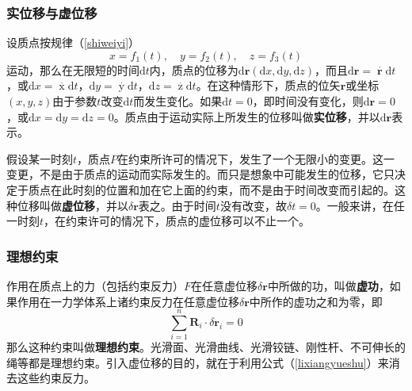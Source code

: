 \documentclass[withoutpreface,bwprint]{cumcmthesis} %
\begin{document}
\subsubsection{实位移与虚位移}
\par 设质点按规律（\ref{shiweiyi}）
\begin{equation}
	\label{shiweiyi}
	x = f_1(t),\quad y = f_2(t),\quad z = f_3(t)
\end{equation}
运动，那么在无限短的时间$\mathrm{d}t$内，质点的位移为$\mathrm{d} \textbf{r}(\mathrm{d}x,\mathrm{d}y,\mathrm{d}z)$，而且$\mathrm{d} \textbf{r} = \mathop{\textbf{r}}\limits^{\cdot} \mathrm{d}t$，或$\mathrm{d}x = \mathop{x}\limits^{\cdot} \mathrm{d}t$，$\mathrm{d}y = \mathop{y}\limits^{\cdot} \mathrm{d}t$，$\mathrm{d}z = \mathop{z}\limits^{\cdot} \mathrm{d}t$。在这种情形下，质点的位矢$\textbf{r}$或坐标$(x,y,z)$由于参数$t$改变$\mathrm{d}t$而发生变化。如果$\mathrm{d}t = 0$，即时间没有变化，则$\mathrm{d} \textbf{r} = 0$，或$\mathrm{d}x= \mathrm{d}y= \mathrm{d}z=0$。质点由于运动实际上所发生的位移叫做\textbf{实位移}，并以$\mathrm{d} \textbf{r}$表示。
\par 假设某一时刻$t$，质点$P$在约束所许可的情况下，发生了一个无限小的变更。这一变更，不是由于质点的运动而实际发生的。而只是想象中可能发生的位移，它只决定于质点在此时刻的位置和加在它上面的约束，而不是由于时间改变而引起的。这种位移叫做\textbf{虚位移}，并以$\delta \textbf{r}$表之。由于时间$t$没有改变，故$\delta t =0$。一般来讲，在任一时刻$t$，在约束许可的情况下，质点的虚位移可以不止一个。
\subsubsection{理想约束}
\par 作用在质点上的力（包括约束反力）$F$在任意虚位移$\delta \textbf{r}$中所做的功，叫做\textbf{虚功}，如果作用在一力学体系上诸约束反力在任意虚位移$\delta \textbf{r}$中所作的虚功之和为零，即
\begin{equation}
	\label{lixiangyueshu}
	\sum\limits_{i=1}^{n} \textbf{R}_i \cdot \delta \textbf{r}_i = 0
\end{equation}
那么这种约束叫做\textbf{理想约束}。光滑面、光滑曲线、光滑铰链、刚性杆、不可伸长的绳等都是理想约束。引入虚位移的目的，就在于利用公式（\ref{lixiangyueshu}）来消去这些约束反力。
\end{document}
